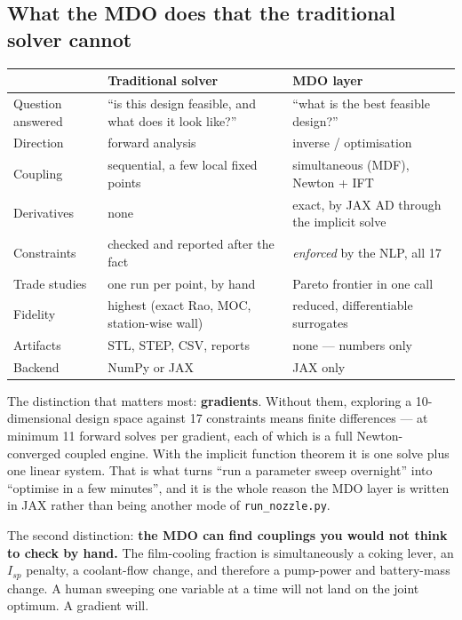\documentclass[11pt]{article}
\newcommand{\cmd}[1]{\nolinkurl{#1}}
\begin{document}
\subsection{What the MDO does that the traditional solver cannot}

\begin{table}[H]\centering\small
\begin{tabular}{@{}p{4.0cm} p{5.2cm} p{5.6cm}@{}}
\toprule
& \textbf{Traditional solver} & \textbf{MDO layer}\\
\midrule
Question answered & ``is this design feasible, and what does it look like?'' & ``what is the best feasible design?''\\
Direction & forward analysis & inverse / optimisation\\
Coupling & sequential, a few local fixed points & simultaneous (MDF), Newton + IFT\\
Derivatives & none & exact, by JAX AD through the implicit solve\\
Constraints & checked and reported after the fact & \emph{enforced} by the NLP, all 17\\
Trade studies & one run per point, by hand & Pareto frontier in one call\\
Fidelity & highest (exact Rao, MOC, station-wise wall) & reduced, differentiable surrogates\\
Artifacts & STL, STEP, CSV, reports & none --- numbers only\\
Backend & NumPy or JAX & JAX only\\
\bottomrule
\end{tabular}
\end{table}

The distinction that matters most: \textbf{gradients}. Without them, exploring
a 10-dimensional design space against 17 constraints means finite differences
--- at minimum 11 forward solves per gradient, each of which is a full
Newton-converged coupled engine. With the implicit function theorem it is one
solve plus one linear system. That is what turns ``run a parameter sweep
overnight'' into ``optimise in a few minutes'', and it is the whole reason
the MDO layer is written in JAX rather than being another mode of
\cmd{run\_nozzle.py}.

The second distinction: \textbf{the MDO can find couplings you would not
think to check by hand.} The film-cooling fraction is simultaneously a
coking lever, an $I_{sp}$ penalty, a coolant-flow change, and therefore a
pump-power and battery-mass change. A human sweeping one variable at a time
will not land on the joint optimum. A gradient will.
\end{document}
